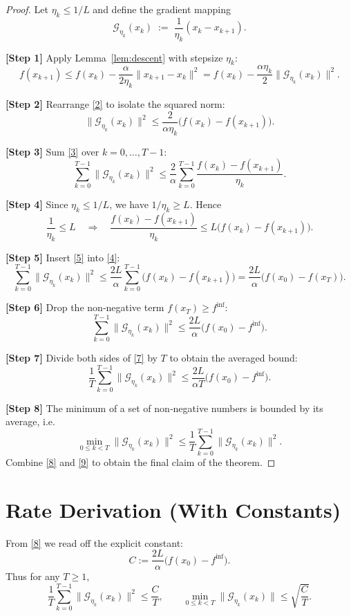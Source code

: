\documentclass{article}
\begin{document}
\begin{proof}
Let $\eta_{k}\le 1/L$ and define the gradient mapping
\[
\mathcal{G}_{\eta_{k}}(x_{k})\;:=\;\frac{1}{\eta_{k}}(x_{k}-x_{k+1}).
\tag{1}\label{def:G}
\]

\noindent\textbf{[Step 1]}  Apply Lemma~\ref{lem:descent} with stepsize $\eta_{k}$:
\[
f(x_{k+1})\le f(x_{k})-\frac{\alpha}{2\eta_{k}}\|x_{k+1}-x_{k}\|^{2}
= f(x_{k})-\frac{\alpha\eta_{k}}{2}\|\mathcal{G}_{\eta_{k}}(x_{k})\|^{2}.
\tag{2}
\]

\noindent\textbf{[Step 2]}  Rearrange \eqref{2} to isolate the squared norm:
\[
\|\mathcal{G}_{\eta_{k}}(x_{k})\|^{2}\le\frac{2}{\alpha\eta_{k}}\bigl(f(x_{k})-f(x_{k+1})\bigr).
\tag{3}
\]

\noindent\textbf{[Step 3]}  Sum \eqref{3} over $k=0,\dots,T-1$:
\[
\sum_{k=0}^{T-1}\|\mathcal{G}_{\eta_{k}}(x_{k})\|^{2}
\le\frac{2}{\alpha}\sum_{k=0}^{T-1}\frac{f(x_{k})-f(x_{k+1})}{\eta_{k}}.
\tag{4}
\]

\noindent\textbf{[Step 4]}  Since $\eta_{k}\le 1/L$, we have $1/\eta_{k}\ge L$. Hence
\[
\frac{1}{\eta_{k}}\le L\quad\Longrightarrow\quad
\frac{f(x_{k})-f(x_{k+1})}{\eta_{k}}
\le L\bigl(f(x_{k})-f(x_{k+1})\bigr).
\tag{5}
\]

\noindent\textbf{[Step 5]}  Insert \eqref{5} into \eqref{4}:
\[
\sum_{k=0}^{T-1}\|\mathcal{G}_{\eta_{k}}(x_{k})\|^{2}
\le\frac{2L}{\alpha}\sum_{k=0}^{T-1}\bigl(f(x_{k})-f(x_{k+1})\bigr)
= \frac{2L}{\alpha}\bigl(f(x_{0})-f(x_{T})\bigr).
\tag{6}
\]

\noindent\textbf{[Step 6]}  Drop the non‑negative term $f(x_{T})\ge f^{\inf}$:
\[
\sum_{k=0}^{T-1}\|\mathcal{G}_{\eta_{k}}(x_{k})\|^{2}
\le\frac{2L}{\alpha}\bigl(f(x_{0})-f^{\inf}\bigr).
\tag{7}
\]

\noindent\textbf{[Step 7]}  Divide both sides of \eqref{7} by $T$ to obtain the averaged bound:
\[
\frac{1}{T}\sum_{k=0}^{T-1}\|\mathcal{G}_{\eta_{k}}(x_{k})\|^{2}
\le\frac{2L}{\alpha T}\bigl(f(x_{0})-f^{\inf}\bigr).
\tag{8}
\]

\noindent\textbf{[Step 8]}  The minimum of a set of non‑negative numbers is bounded by its average, i.e.
\[
\min_{0\le k<T}\|\mathcal{G}_{\eta_{k}}(x_{k})\|^{2}
\le\frac{1}{T}\sum_{k=0}^{T-1}\|\mathcal{G}_{\eta_{k}}(x_{k})\|^{2}.
\tag{9}
\]
Combine \eqref{8} and \eqref{9} to obtain the final claim of the theorem.
\end{proof}

\section*{Rate Derivation (With Constants)}
From \eqref{8} we read off the explicit constant:
\[
C:=\frac{2L}{\alpha}\bigl(f(x_{0})-f^{\inf}\bigr).
\]
Thus for any $T\ge1$,
\[
\frac{1}{T}\sum_{k=0}^{T-1}\|\mathcal{G}_{\eta_{k}}(x_{k})\|^{2}\le\frac{C}{T},
\qquad
\min_{0\le k<T}\|\mathcal{G}_{\eta_{k}}(x_{k})\|\le\sqrt{\frac{C}{T}}.
\]
\end{document}
